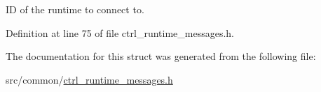 I\-D of the runtime to connect to. 



Definition at line 75 of file ctrl\-\_\-runtime\-\_\-messages.\-h.



The documentation for this struct was generated from the following file\-:\begin{DoxyCompactItemize}
\item 
src/common/\hyperlink{ctrl__runtime__messages_8h}{ctrl\-\_\-runtime\-\_\-messages.\-h}\end{DoxyCompactItemize}
